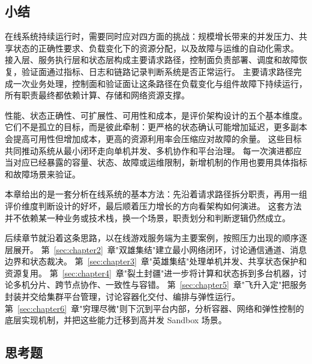 \subsection{小结}\label{sec1:summary}

在线系统持续运行时，需要同时应对四方面的挑战：规模增长带来的并发压力、共享状态的正确性要求、负载变化下的资源分配，以及故障与运维的自动化需求。
接入层、服务执行层和状态层构成主要请求路径，控制面负责部署、调度和故障恢复，验证面通过指标、日志和链路记录判断系统是否正常运行。
主要请求路径完成一次业务处理，控制面和验证面让这条路径在负载变化与组件故障下持续运行，所有职责最终都依赖计算、存储和网络资源支撑。

性能、状态正确性、可扩展性、可用性和成本，是评价架构设计的五个基本维度。
它们不是孤立的目标，而是彼此牵制：更严格的状态确认可能增加延迟，更多副本会提高可用性但增加成本，更高的资源利用率会压缩应对故障的余量。
这些目标共同推动系统从最小闭环走向单机并发、多机协作和平台治理。
每一次演进都应当对应已经暴露的容量、状态、故障或运维限制，新增机制的作用也要用具体指标和故障场景来验证。

本章给出的是一套分析在线系统的基本方法：先沿着请求路径拆分职责，再用一组评价维度判断设计的好坏，最后顺着压力增长的方向看架构如何演进。
这套方法并不依赖某一种业务或技术栈，换一个场景，职责划分和判断逻辑仍然成立。

后续章节就沿着这条思路，以在线游戏服务端为主要案例，按照压力出现的顺序逐层展开。
第~\ref{sec:chapter2}~章"双雄集结"建立最小网络闭环，讨论通信通道、消息边界和状态裁决。
第~\ref{sec:chapter3}~章"英雄集结"处理单机并发、共享状态保护和资源复用。
第~\ref{sec:chapter4}~章"裂土封疆"进一步将计算和状态拆到多台机器，讨论多机分片、跨节点协作、一致性与容错。
第~\ref{sec:chapter5}~章"飞升入定"把服务封装并交给集群平台管理，讨论容器化交付、编排与弹性运行。
第~\ref{sec:chapter6}~章"穷理尽微"则下沉到平台内部，分析容器、网络和弹性控制的底层实现机制，并把这些能力迁移到高并发 Sandbox 场景。

\subsection{思考题}

